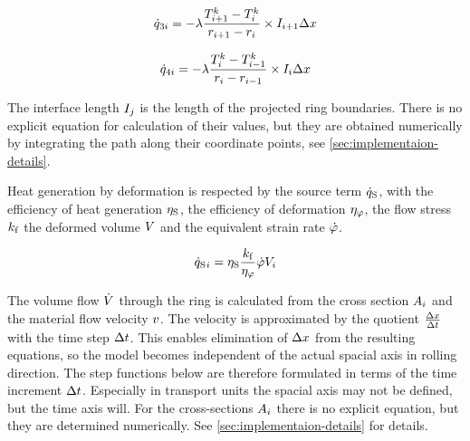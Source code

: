\documentclass{PyRollDocs}
\begin{document}
    \begin{equation}
        {\dot{q}}_{3{i}} = -{\lambda} \frac{{T}_{{i}+1}^{{k}}-{T}_{{i}}^{{k}}}{{r}_{{i}+1} - {r}_{{i}}} \times {I}_{{i}+1} {\Delta x}
        \label{eq:heat_flow_3}
    \end{equation}

    \begin{equation}
        {\dot{q}}_{4{i}} = -{\lambda} \frac{{T}_{{i}}^{{k}}-{T}_{{i}-1}^{{k}}}{{r}_{{i}} - {r}_{{i} - 1}} \times {I}_{{i}} {\Delta x}
        \label{eq:heat_flow_4}
    \end{equation}

    The interface length ${I}_{j}$ is the length of the projected ring boundaries.
    There is no explicit equation for calculation of their values, but they are obtained numerically by integrating the path along their coordinate points, see \autoref{sec:implementaion-details}.

    Heat generation by deformation is respected by the source term ${\dot{q}_\mathrm{S}}$, with the efficiency of heat generation ${\eta_\mathrm{S}}$, the efficiency of deformation ${\eta_\varphi}$, the flow stress ${k_\mathrm{f}}$ the deformed volume ${V}$ and the equivalent strain rate ${\dot{\varphi}}$.

    \begin{equation}
        {\dot{q}_\mathrm{S}}{}_{i} = {\eta_\mathrm{S}} \frac{{k_\mathrm{f}}}{{\eta_\varphi}} {\dot{\varphi}} {V}_{{i}}
        \label{eq:heat_source}
    \end{equation}

    The volume flow ${\dot{V}}$ through the ring is calculated from the cross section ${A}_{i}$ and the material flow velocity ${v}$.
    The velocity is approximated by the quotient $\frac{{\Delta x}}{{\Delta t}}$ with the time step ${\Delta t}$.
    This enables elimination of ${\Delta x}$ from the resulting equations, so the model becomes independent of the actual spacial axis in rolling direction.
    The step functions below are therefore formulated in terms of the time increment ${\Delta t}$.
    Especially in transport units the spacial axis may not be defined, but the time axis will.
    For the cross-sections ${A}_{i}$ there is no explicit equation, but they are determined numerically.
    See \autoref{sec:implementaion-details} for details.
\end{document}
